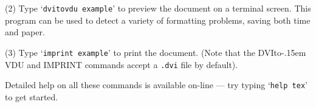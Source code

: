 {\parskip=0pt    %
\item{(2)}
Type `{\tt dvitovdu example}' to preview the document on a terminal screen.
This program can be used to detect a variety of formatting problems,
saving both time and paper.

\item{(3)}
Type `{\tt imprint example}' to print the document.
(Note that the DVIto\kern-.15em VDU and IMPRINT commands
accept a {\tt .dvi} file by default).

}                %

Detailed help on all these commands is available on-line --- try typing
`{\tt help tex}' to get started.

\bye
